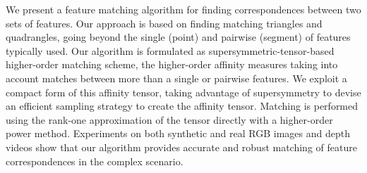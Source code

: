 We present a feature matching algorithm for finding correspondences between two sets of features.
Our approach is based on finding matching triangles and quadrangles, going beyond the single (point) and pairwise (segment) of features typically used.
Our algorithm is formulated as supersymmetric-tensor-based higher-order matching scheme,
the higher-order affinity measures taking into account matches between more than a single or pairwise features.
We exploit a compact form of this affinity tensor, taking advantage of supersymmetry to devise an efficient sampling strategy to create the affinity tensor.
Matching is performed using the rank-one approximation of the tensor directly with a higher-order power method.
Experiments on both synthetic and real RGB images and depth videos show that
our algorithm provides accurate and robust matching of feature correspondences in the complex scenario.
